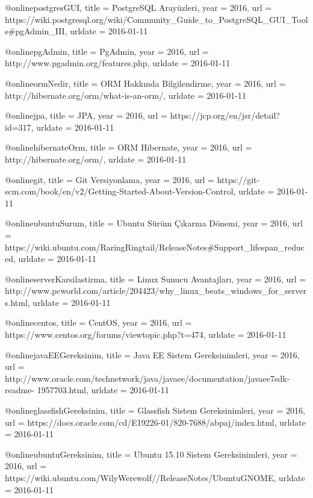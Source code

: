 @online{postgresGUI,
    title = {PostgreSQL Arayüzleri},
    year = 2016,
    url = {https://wiki.postgresql.org/wiki/Community_Guide_to_PostgreSQL_GUI_Tools#pgAdmin_III},
    urldate = {2016-01-11}
}


@online{pgAdmin,
    title = {PgAdmin},
    year = 2016,
    url = {http://www.pgadmin.org/features.php},
    urldate = {2016-01-11}
}


@online{ormNedir,
    title = {ORM Hakkında Bilgilendirme},
    year = 2016,
    url = {http://hibernate.org/orm/what-is-an-orm/},
    urldate = {2016-01-11}
}


@online{jpa,
    title = {JPA},
    year = 2016,
    url = {https://jcp.org/en/jsr/detail?id=317},
    urldate = {2016-01-11}
}

@online{hibernateOrm,
    title = {ORM Hibernate},
    year = 2016,
    url = {http://hibernate.org/orm/},
    urldate = {2016-01-11}
}

@online{git,
    title = {Git Versiyonlama},
    year = 2016,
    url = {https://git-scm.com/book/en/v2/Getting-Started-About-Version-Control},
    urldate = {2016-01-11}
}

@online{ubuntuSurum,
    title = {Ubuntu Sürüm Çıkarma Dönemi},
    year = 2016,
    url = {https://wiki.ubuntu.com/RaringRingtail/ReleaseNotes#Support_lifespan_reduced},
    urldate = {2016-01-11}
}

@online{serverKarsilastirma,
    title = {Linux Sunucu Avantajları},
    year = 2016,
    url = {http://www.pcworld.com/article/204423/why_linux_beats_windows_for_servers.html},
    urldate = {2016-01-11}
}

@online{centos,
    title = {CentOS},
    year = 2016,
    url = {https://www.centos.org/forums/viewtopic.php?t=474},
    urldate = {2016-01-11}
}

@online{javaEEGereksinim,
    title = {Java EE Sistem Gereksinimleri},
    year = 2016,
    url = {http://www.oracle.com/technetwork/java/javaee/documentation/javaee7sdk-readme-
1957703.html},
    urldate = {2016-01-11}
}

@online{glassfishGereksinim,
    title = {Glassfish Sistem Gereksinimleri},
    year = 2016,
    url = {https://docs.oracle.com/cd/E19226-01/820-7688/abpaj/index.html},
    urldate = {2016-01-11}
}

@online{ubuntuGereksinim,
    title = {Ubuntu 15.10 Sistem Gereksinimleri},
    year = 2016,
    url = {https://wiki.ubuntu.com/WilyWerewolf//ReleaseNotes/UbuntuGNOME},
    urldate = {2016-01-11}
}

